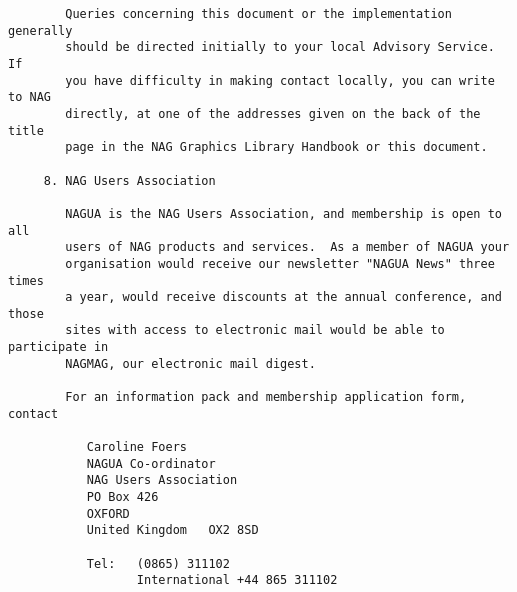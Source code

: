 \begin{verbatim}
        Queries concerning this document or the implementation generally
        should be directed initially to your local Advisory Service.  If
        you have difficulty in making contact locally, you can write to NAG
        directly, at one of the addresses given on the back of the title
        page in the NAG Graphics Library Handbook or this document.

     8. NAG Users Association

        NAGUA is the NAG Users Association, and membership is open to all
        users of NAG products and services.  As a member of NAGUA your
        organisation would receive our newsletter "NAGUA News" three times
        a year, would receive discounts at the annual conference, and those
        sites with access to electronic mail would be able to participate in
        NAGMAG, our electronic mail digest.

        For an information pack and membership application form, contact

           Caroline Foers
           NAGUA Co-ordinator
           NAG Users Association
           PO Box 426
           OXFORD
           United Kingdom   OX2 8SD

           Tel:   (0865) 311102
                  International +44 865 311102

\end{verbatim}

